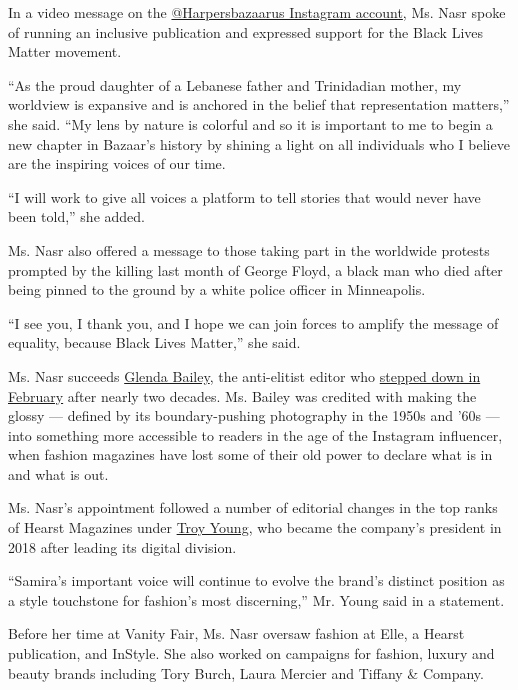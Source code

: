 In a video message on the
\href{https://www.instagram.com/harpersbazaarus/?hl=en}{@Harpersbazaarus
Instagram account}, Ms. Nasr spoke of running an inclusive publication
and expressed support for the Black Lives Matter movement.

``As the proud daughter of a Lebanese father and Trinidadian mother, my
worldview is expansive and is anchored in the belief that representation
matters,'' she said. ``My lens by nature is colorful and so it is
important to me to begin a new chapter in Bazaar's history by shining a
light on all individuals who I believe are the inspiring voices of our
time.

``I will work to give all voices a platform to tell stories that would
never have been told,'' she added.

Ms. Nasr also offered a message to those taking part in the worldwide
protests prompted by the killing last month of George Floyd, a black man
who died after being pinned to the ground by a white police officer in
Minneapolis.

``I see you, I thank you, and I hope we can join forces to amplify the
message of equality, because Black Lives Matter,'' she said.

Ms. Nasr succeeds
\href{https://www.nytimes3xbfgragh.onion/2020/01/17/style/harpers-bazaar-glenda-bailey.html}{Glenda
Bailey}, the anti-elitist editor who
\href{https://www.nytimes3xbfgragh.onion/2020/01/15/style/glenda-bailey-harpers-bazaar.html}{stepped
down in February} after nearly two decades. Ms. Bailey was credited with
making the glossy --- defined by its boundary-pushing photography in the
1950s and '60s --- into something more accessible to readers in the age
of the Instagram influencer, when fashion magazines have lost some of
their old power to declare what is in and what is out.

Ms. Nasr's appointment followed a number of editorial changes in the top
ranks of Hearst Magazines under
\href{https://www.nytimes3xbfgragh.onion/2020/07/22/business/media/hearst-harassment-troy-young.html}{Troy
Young}, who became the company's president in 2018 after leading its
digital division.

``Samira's important voice will continue to evolve the brand's distinct
position as a style touchstone for fashion's most discerning,'' Mr.
Young said in a statement.

Before her time at Vanity Fair, Ms. Nasr oversaw fashion at Elle, a
Hearst publication, and InStyle. She also worked on campaigns for
fashion, luxury and beauty brands including Tory Burch, Laura Mercier
and Tiffany \& Company.

